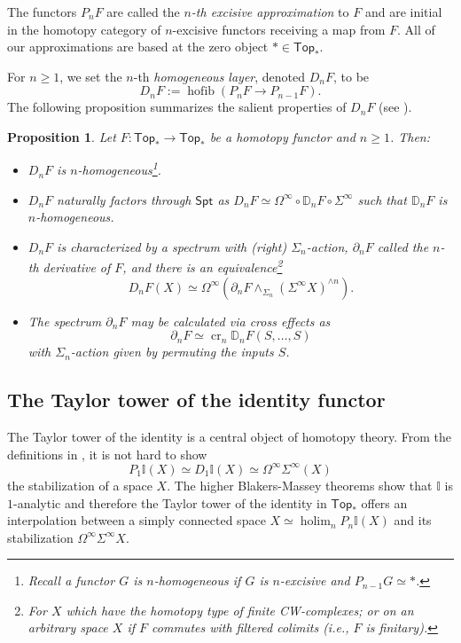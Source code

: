 \documentclass[12pt]{amsart}
\newtheorem{proposition}[subsection]{Proposition}
\theoremstyle{definition}
\theoremstyle{remark}
\newcommand{\Top}{\mathsf{Top}_*}
\newcommand{\Spt}{\mathsf{Spt}}
\newcommand{\Sp}{\Sigma^{\infty}}
\newcommand{\U}{\Omega^{\infty}}
\newcommand{\holim}{\operatorname{holim}}
\newcommand{\cro}{\operatorname{cr}}
\newcommand{\hofib}{\operatorname{hofib}}
\newcommand{\Id}{\mathbb{I}}
\newcommand{\pt}{*}
\begin{document}
The functors $P_nF$ are called the \textit{$n$-th excisive approximation} to $F$ and are initial in the homotopy category of $n$-excisive functors receiving a map from $F$. All of our approximations are based at the zero object $\pt \in \Top$. 

For $n\geq 1$, we set the $n$-th \textit{homogeneous layer}, denoted $D_nF$, to be \[D_nF :=\hofib(P_nF\to P_{n-1}F).\] 
The following proposition summarizes the salient properties of $D_n F$ (see \cite{Goo-Calc3}). 

\begin{proposition}
\label{prop:functor-calc-recap-top}
Let $F\colon \Top\to \Top$ be a homotopy functor and $n\geq 1$. Then: \begin{itemize}
\item $D_nF$ is \textit{$n$-homogeneous}\footnote{Recall a functor $G$ is $n$-homogeneous if $G$ is $n$-excisive and $P_{n-1}G\simeq \pt$.}.

\item $D_nF$ naturally factors through $\Spt$ as $ D_nF\simeq \U \circ \mathbb{D}_nF \circ \Sp$ such that $\mathbb{D}_n F$ is $n$-homogeneous.

\item $D_nF$ is characterized by a spectrum with (right) $\Sigma_n$-action, $\partial_n F$ called the \textit{$n$-th derivative} of $F$, and there is an equivalence\footnote{For $X$ which have the homotopy type of finite CW-complexes; or on an arbitrary space $X$ if $F$ commutes with filtered colimits (i.e., $F$ is \textit{finitary}). } \[
    D_n F(X) \simeq \U (\partial_nF \wedge_{\Sigma_n} (\Sp X)^{\wedge n}).\]
    
\item The spectrum $\partial_nF$ may be calculated via cross effects \cite[]{Goo-Calc3} as \[\partial_n F \simeq \cro_n \mathbb{D}_n F (S,\dots,S)\] with $\Sigma_n$-action given by permuting the inputs $S$.
\end{itemize}
\end{proposition}

\subsection{The Taylor tower of the identity functor} 
The Taylor tower of the identity is a central object of homotopy theory. From the definitions in \cite{Goo-Calc3}, it is not hard to show \begin{equation} \label{P_1Id}
    P_1\Id(X)\simeq D_1\Id(X)\simeq \U \Sp (X)
    \end{equation}
the stabilization of a space $X$. The higher Blakers-Massey theorems \cite[2.5, 2.6]{Goo-Calc2} show that $\Id$ is $1$-analytic and therefore the Taylor tower of the identity in $\Top$ offers an interpolation between a simply connected space $X\simeq \holim_n P_n\Id(X)$ and its stabilization $\U \Sp X$. 
\end{document}
